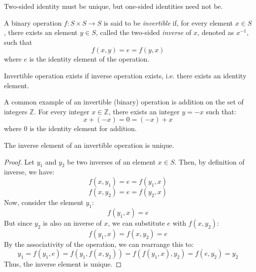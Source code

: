 \documentclass[11pt,fleqn]{book} %
\begin{document}
\begin{remark}
    Two-sided identity must be unique, but one-sided identities need not be.
\end{remark}

\begin{example}
    
\end{example}

\begin{definition}
    A binary operation $f: S \times S \to S$ is said to be \emph{invertible} if, for every element $x \in S$, there exists an element $y \in S$, called the two-sided \emph{inverse} of $x$, denoted as $x^{-1}$, such that
    \[ f(x,y) = e = f(y,x) \]
    where $e$ is the identity element of the operation.
\end{definition}

\begin{remark}
    Invertible operation exists if inverse operation exists, i.e. there exists an identity element.
\end{remark}

\begin{example}
    A common example of an invertible (binary) operation is addition on the set of integers $\mathbb{Z}$. For every integer $x \in \mathbb{Z}$, there exists an integer $y = -x$ such that:
    \begin{equation}
        x + (-x) = 0 = (-x) + x
    \end{equation}
    where $0$ is the identity element for addition.
\end{example}

\begin{proposition}
    The inverse element of an invertible operation is unique.
\end{proposition}

\begin{proof}
    Let $y_1$ and $y_2$ be two inverses of an element $x \in S$. Then, by definition of inverse, we have:
    \[ f(x,y_1) = e = f(y_1,x) \]
    \[ f(x,y_2) = e = f(y_2,x) \]
    Now, consider the element $y_1$:
    \[ f(y_1,x) = e \]
    But since $y_2$ is also an inverse of $x$, we can substitute $e$ with $f(x,y_2)$:
    \[ f(y_1,x) = f(x,y_2) = e \]
    By the associativity of the operation, we can rearrange this to:
    \[ y_1 = f(y_1, e) = f(y_1,f(x,y_2)) = f(f(y_1,x),y_2) = f(e,y_2) = y_2 \]
    Thus, the inverse element is unique.
\end{proof}
\end{document}
